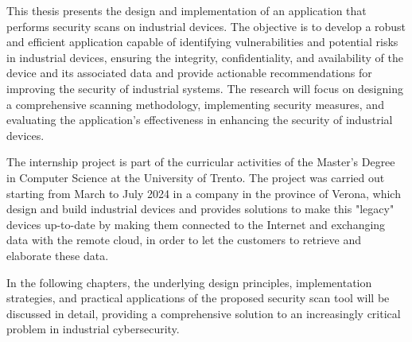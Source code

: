 This thesis presents the design and implementation of an application that performs security scans on industrial devices. The objective is to develop a robust and efficient application capable of identifying vulnerabilities and potential risks in industrial devices, ensuring the integrity, confidentiality, and availability of the device and its associated data and provide actionable recommendations for improving the security of industrial systems. The research will focus on designing a comprehensive scanning methodology, implementing security measures, and evaluating the application's effectiveness in enhancing the security of industrial devices. 

The internship project is part of the curricular activities of the Master's Degree in Computer Science at the University of Trento. The project was carried out starting from March to July 2024 in a company in the province of Verona, which design and build industrial devices and provides solutions to make this "legacy" devices up-to-date by making them connected to the Internet and exchanging data with the remote cloud, in order to let the customers to retrieve and elaborate these data.

In the following chapters, the underlying design principles, implementation strategies, and practical applications of the proposed security scan tool will be discussed in detail, providing a comprehensive solution to an increasingly critical problem in industrial cybersecurity.
